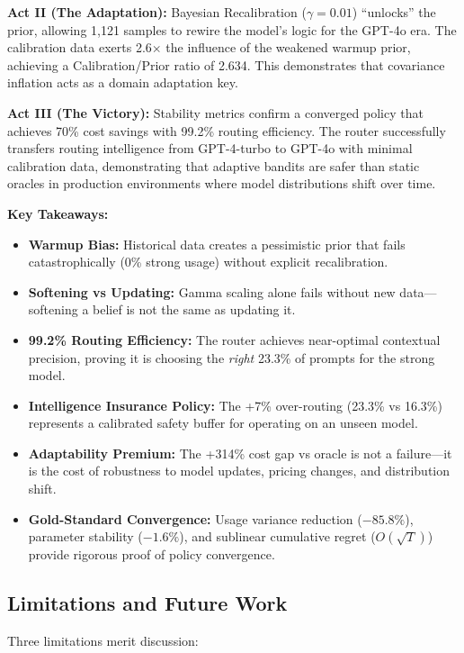 \textbf{Act II (The Adaptation):} Bayesian Recalibration ($\gamma=0.01$) ``unlocks'' the prior, allowing 1,121 samples to rewire the model's logic for the GPT-4o era. The calibration data exerts 2.6$\times$ the influence of the weakened warmup prior, achieving a Calibration/Prior ratio of 2.634. This demonstrates that covariance inflation acts as a domain adaptation key.

\textbf{Act III (The Victory):} Stability metrics confirm a converged policy that achieves 70\% cost savings with 99.2\% routing efficiency. The router successfully transfers routing intelligence from GPT-4-turbo to GPT-4o with minimal calibration data, demonstrating that adaptive bandits are safer than static oracles in production environments where model distributions shift over time.

\textbf{Key Takeaways:}
\begin{itemize}
    \item \textbf{Warmup Bias:} Historical data creates a pessimistic prior that fails catastrophically (0\% strong usage) without explicit recalibration.
    \item \textbf{Softening vs Updating:} Gamma scaling alone fails without new data—softening a belief is not the same as updating it.
    \item \textbf{99.2\% Routing Efficiency:} The router achieves near-optimal contextual precision, proving it is choosing the \emph{right} 23.3\% of prompts for the strong model.
    \item \textbf{Intelligence Insurance Policy:} The +7\% over-routing (23.3\% vs 16.3\%) represents a calibrated safety buffer for operating on an unseen model.
    \item \textbf{Adaptability Premium:} The +314\% cost gap vs oracle is not a failure—it is the cost of robustness to model updates, pricing changes, and distribution shift.
    \item \textbf{Gold-Standard Convergence:} Usage variance reduction ($-85.8\%$), parameter stability ($-1.6\%$), and sublinear cumulative regret ($O(\sqrt{T})$) provide rigorous proof of policy convergence.
\end{itemize}

\subsection{Limitations and Future Work}
\label{sec:limitations}

Three limitations merit discussion:

